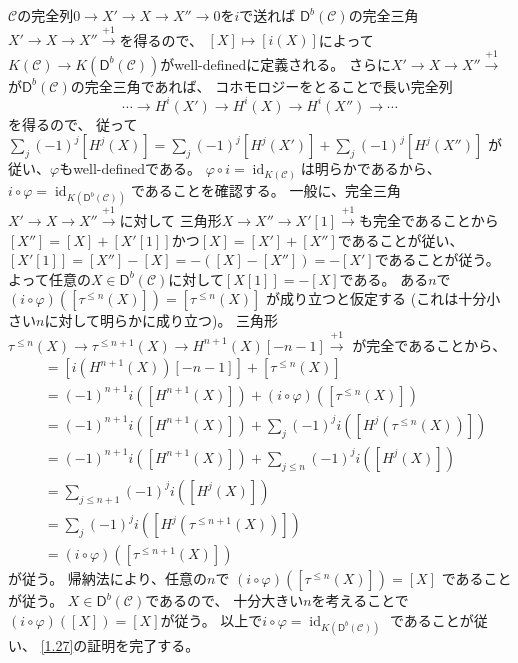 \documentclass[uplatex,dvipdfmx]{jsarticle}
\makeatletter
\theoremstyle{definition}
\renewenvironment{proof}[1][\proofname]{
  \pushQED{\qed}%
  \normalfont \topsep6\p@\@plus6\p@\relax
  \trivlist
  \item[\hskip\labelsep
    #1\@addpunct{\textbf{.}}]\ignorespaces
}{%
  \popQED\endtrivlist\@endpefalse
}
\providecommand{\proofname}{証明}
\DeclareMathOperator{\id}{\mathrm{id}}
\newcommand{\sfD}{\mathsf{D}}
\newcommand\mcC{\mathcal{C}}
\makeatother
\begin{document}
\begin{proof}
  \(\mcC\)の完全列\(0\to X'\to X\to X''\to 0\)を\(i\)で送れば
  \(\sfD^b(\mcC)\)の完全三角
  \(X'\to X\to X''\xrightarrow{+1}\)を得るので、
  \([X]\mapsto [i(X)]\)によって
  \(K(\mcC)\to K(\sfD^b(\mcC))\)がwell-definedに定義される。
  さらに\(X'\to X\to X''\xrightarrow{+1}\)が\(\sfD^b(\mcC)\)の完全三角であれば、
  コホモロジーをとることで長い完全列
  \[\cdots \to H^i(X')\to H^i(X) \to H^i(X'') \to \cdots\]
  を得るので、
  従って\(\sum_j(-1)^j[H^j(X)] = \sum_j(-1)^j[H^j(X')] + \sum_j(-1)^j[H^j(X'')]\)
  が従い、\(\varphi\)もwell-definedである。
  \(\varphi\circ i = \id_{K(\mcC)}\)は明らかであるから、
  \(i\circ \varphi = \id_{K(\sfD^b(\mcC))}\)であることを確認する。
  一般に、完全三角\(X'\to X\to X'' \xrightarrow{+1}\)に対して
  三角形\(X\to X''\to X'[1] \xrightarrow{+1}\)も完全であることから
  \([X''] = [X]+[X'[1]]\)かつ\([X] = [X']+[X'']\)であることが従い、
  \([X'[1]] = [X'']-[X] = -([X]-[X'']) = -[X']\)であることが従う。
  よって任意の\(X\in \sfD^b(\mcC)\)に対して\([X[1]] = -[X]\)である。
  ある\(n\)で
  \((i\circ \varphi)([\tau^{\leq n}(X)]) = [\tau^{\leq n}(X)]\)
  が成り立つと仮定する
  (これは十分小さい\(n\)に対して明らかに成り立つ)。
  三角形
  \(\tau^{\leq n}(X) \to \tau^{\leq n+1}(X) \to H^{n+1}(X)[-n-1]\xrightarrow{+1}\)
  が完全であることから、
  \begin{align*}
    [\tau^{\leq n+1}(X)] &= [i(H^{n+1}(X))[-n-1]] + [\tau^{\leq n}(X)] \\
    &= (-1)^{n+1}i([H^{n+1}(X)]) + (i\circ \varphi)([\tau^{\leq n}(X)]) \\
    &= (-1)^{n+1}i([H^{n+1}(X)]) + \sum_j(-1)^ji([H^j(\tau^{\leq n}(X))]) \\
    &= (-1)^{n+1}i([H^{n+1}(X)]) + \sum_{j\leq n}(-1)^ji([H^j(X)]) \\
    &= \sum_{j\leq n+1}(-1)^ji([H^j(X)]) \\
    &= \sum_j(-1)^ji([H^j(\tau^{\leq n+1}(X))]) \\
    &= (i\circ \varphi)([\tau^{\leq n+1}(X)])
  \end{align*}
  が従う。
  帰納法により、任意の\(n\)で
  \((i\circ \varphi)([\tau^{\leq n}(X)]) = [X]\)
  であることが従う。
  \(X\in \sfD^b(\mcC)\)であるので、
  十分大きい\(n\)を考えることで
  \((i\circ\varphi)([X]) = [X]\)が従う。
  以上で\(i\circ \varphi = \id_{K(\sfD^b(\mcC))}\)
  であることが従い、
  \autoref{1.27}の証明を完了する。
\end{proof}
\end{document}
